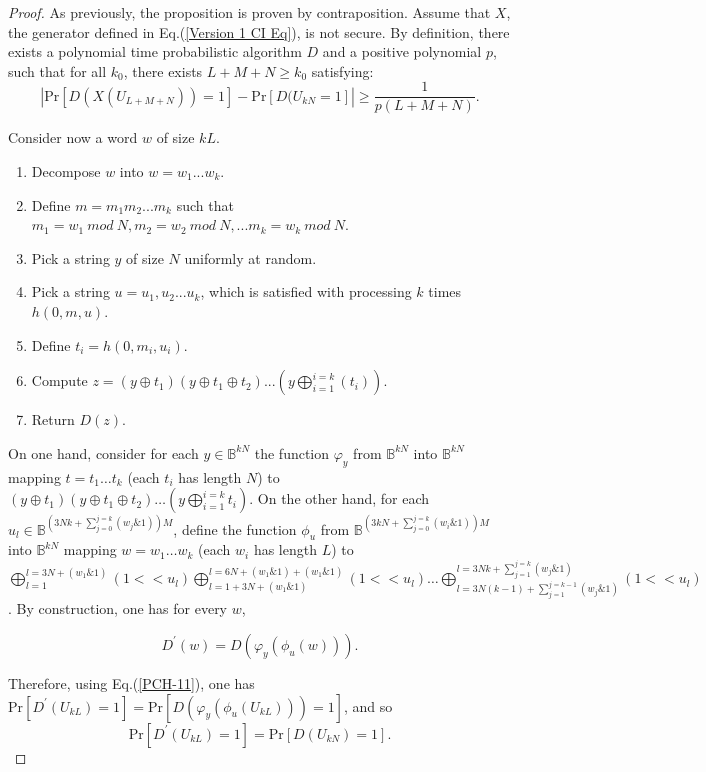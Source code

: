\begin{proof}
As previously, the proposition is proven by contraposition. Assume that $X$, 
the generator defined in Eq.(\ref{Version 1 CI Eq}), is not
secure. By definition, there exists a polynomial time probabilistic
algorithm $D$ and a positive polynomial $p$, such that for all $k_0$, there exists
$L+M+N\geq {k_0}$ satisfying: 
$$| \mathrm{Pr}[D(X(U_{L+M+N}))=1]-\mathrm{Pr}[D(U_{kN}=1]|\geq \frac{1}{p(L+M+N)}.$$

\noindent Consider now a word $w$ of size $kL$.
\begin{enumerate}
 \item Decompose $w$ into $w = w_1...w_k$.
 \item Define $m=m_1m_2...m_k$ such that $m_1 = w_1~mod~N, m_2 = w_2 ~mod~N, ... m_k = w_k~mod~N$.
 \item Pick a string $y$ of size $N$ uniformly at random.
 \item Pick a string $u = {u_1,u_2...u_k}$, which is satisfied with processing $k$ times $h(0, m, u)$.
 \item Define $t_i = h(0,m_i,u_i)$.
 \item Compute $z = (y\oplus t_1) (y\oplus t_1 \oplus t_2) ... (y\bigoplus_{i=1}^{i=k}(t_i))$.
 \item Return $D(z)$.
\end{enumerate}


On one hand, consider for each $y\in \mathbb{B}^{kN}$ the function $\varphi_{y}$
from $\mathbb{B}^{kN}$ into $\mathbb{B}^{kN}$ mapping $t=t_1\ldots t_k$
(each $t_i$ has length $N$) to 
$(y\oplus t_1 )(y\oplus t_1\oplus t_2)\ldots (y
  \bigoplus_{i=1}^{i=k} t_i)$. 
 On the other hand, for each $u_l \in \mathbb{B}^{(3Nk + \sum_{j=0}^{j=k}(w_j\&1)) M}$, define the function $\phi_{u}$
 from $\mathbb{B}^{(3kN + \sum_{j=0}^{j=k}(w_i\&1)) M}$ into $\mathbb{B}^{kN}$ mapping $w = w_1 \ldots w_k$ (each 
 $w_i$ has length $L$) to 
 $\bigoplus_{l=1}^{l=3N+(w_1\&1)}(1<<u_l) \bigoplus_{l=1+3N+(w_1\&1)}^{l=6N+(w_1\&1)+(w_1\&1)}(1<<u_l) \ldots 
 \bigoplus_{l=3N(k-1)+\sum_{j=1}^{j=k-1}(w_j\&1)}^{l=3Nk+\sum_{j=1}^{j=k}(w_j\&1)}(1<<u_l)$.
 By construction, one has for every $w$,
  
\begin{equation}\label{PCH-11}
D^\prime(w)=D(\varphi_y(\phi_u(w))).
\end{equation}

Therefore, using Eq.(\ref{PCH-11}),
one has
$\mathrm{Pr}[D^\prime(U_{kL})=1]=\mathrm{Pr}[D(\varphi_y(\phi_u(U_{kL})))=1]$, and
so
\begin{equation}\label{PCH-22}
\mathrm{Pr}[D^\prime(U_{kL})=1]=\mathrm{Pr}[D(U_{kN})=1].
\end{equation}


\end{proof}
